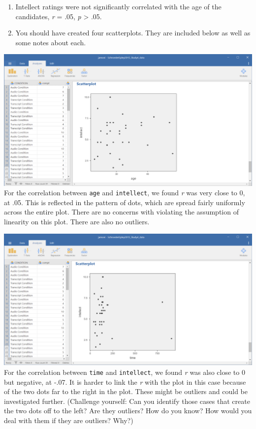 \documentclass[
]{book}
\begin{document}
\begin{enumerate}
\def\labelenumi{\arabic{enumi}.}
\item
  Intellect ratings were not significantly correlated with the age of the candidates, \emph{r} = .05, \emph{p} \textgreater{} .05.
\item
  You should have created four scatterplots. They are included below as well as some notes about each.
\end{enumerate}

\includegraphics{img/7.4.69.png}
For the correlation between \texttt{age} and \texttt{intellect}, we found \emph{r} was very close to 0, at .05. This is reflected in the pattern of dots, which are spread fairly uniformly across the entire plot. There are no concerns with violating the assumption of linearity on this plot. There are also no outliers.

\includegraphics{img/7.4.70.png}
For the correlation between \texttt{time} and \texttt{intellect}, we found \emph{r} was also close to 0 but negative, at -.07. It is harder to link the \emph{r} with the plot in this case because of the two dots far to the right in the plot. These might be outliers and could be investigated further. (Challenge yourself: Can you identify those cases that create the two dots off to the left? Are they outliers? How do you know? How would you deal with them if they are outliers? Why?)
\end{document}

